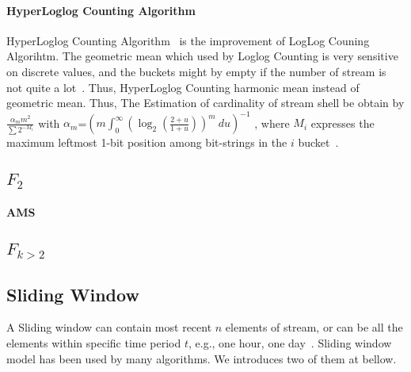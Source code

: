 \paragraph{HyperLoglog Counting Algorithm}

HyperLoglog Counting Algorithm~\cite{flajolet2007hyperloglog} is the improvement
of LogLog Couning Algorihtm. The geometric mean which used by Loglog Counting is
very sensitive on discrete values, and the buckets might by empty if the number
of stream is not quite a lot~\cite{flajolet2007hyperloglog}. Thus, HyperLoglog
Counting harmonic mean instead of geometric mean. Thus, The Estimation of
cardinality of stream shell be obtain by $\frac{\alpha_m m^2 }{\sum 2^{-M_i}}$
with $\alpha_m$=$(m \int_0^\infty(\log_2(\frac{2+u}{1+u}))^m\ du)^{-1}$ , where
$M_i$ expresses the maximum leftmost 1-bit position among bit-strings in the $i$
bucket~\cite{flajolet2007hyperloglog}.

\subsection{ $F_2$}
\paragraph{AMS}

\subsection{$F_{k>2}$}

\subsection{Sliding Window}
A Sliding window can contain most recent $n$ elements of stream, or can be all
the elements within specific time period $t$, e.g., one hour, one
day~\cite{leskovec2014mining}. Sliding window model has been used by many
algorithms. We introduces two of them at bellow.

